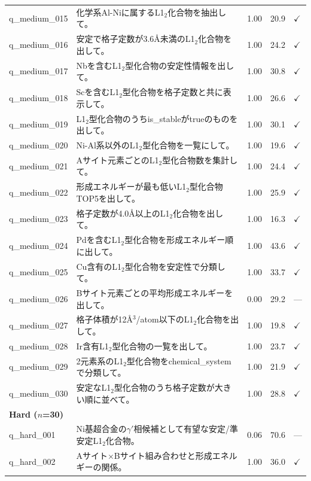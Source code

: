 \documentclass{npj-compt.mater}
\begin{document}
\begin{longtable}{lp{8.5cm}ccl}
    q\_medium\_015 & 化学系Al-Niに属するL1$_2$化合物を抽出して。 & 1.00 & 20.9 & $\checkmark$ \\
    q\_medium\_016 & 安定で格子定数が3.6\AA 未満のL1$_2$化合物を出して。 & 1.00 & 24.2 & $\checkmark$ \\
    q\_medium\_017 & Nbを含むL1$_2$型化合物の安定性情報を出して。 & 1.00 & 30.8 & $\checkmark$ \\
    q\_medium\_018 & Scを含むL1$_2$型化合物を格子定数と共に表示して。 & 1.00 & 26.6 & $\checkmark$ \\
    q\_medium\_019 & L1$_2$型化合物のうちis\_stableがtrueのものを出して。 & 1.00 & 30.1 & $\checkmark$ \\
    q\_medium\_020 & Ni-Al系以外のL1$_2$型化合物を一覧にして。 & 1.00 & 19.6 & $\checkmark$ \\
    q\_medium\_021 & Aサイト元素ごとのL1$_2$型化合物数を集計して。 & 1.00 & 24.4 & $\checkmark$ \\
    q\_medium\_022 & 形成エネルギーが最も低いL1$_2$型化合物TOP5を出して。 & 1.00 & 25.9 & $\checkmark$ \\
    q\_medium\_023 & 格子定数が4.0\AA 以上のL1$_2$化合物を出して。 & 1.00 & 16.3 & $\checkmark$ \\
    q\_medium\_024 & Pdを含むL1$_2$型化合物を形成エネルギー順に出して。 & 1.00 & 43.6 & $\checkmark$ \\
    q\_medium\_025 & Cu含有のL1$_2$型化合物を安定性で分類して。 & 1.00 & 33.7 & $\checkmark$ \\
    q\_medium\_026 & Bサイト元素ごとの平均形成エネルギーを出して。 & 0.00 & 29.2 & --- \\
    q\_medium\_027 & 格子体積が12\AA$^3$/atom以下のL1$_2$化合物を出して。 & 1.00 & 19.8 & $\checkmark$ \\
    q\_medium\_028 & Ir含有L1$_2$型化合物の一覧を出して。 & 1.00 & 23.7 & $\checkmark$ \\
    q\_medium\_029 & 2元素系のL1$_2$型化合物をchemical\_systemで分類して。 & 1.00 & 21.9 & $\checkmark$ \\
    q\_medium\_030 & 安定なL1$_2$型化合物のうち格子定数が大きい順に並べて。 & 1.00 & 28.8 & $\checkmark$ \\
    \midrule
    \multicolumn{5}{l}{\textbf{Hard ($n$=30)}} \\
    \midrule
    q\_hard\_001 & Ni基超合金の$\gamma'$相候補として有望な安定/準安定L1$_2$化合物。 & 0.06 & 70.6 & --- \\
    q\_hard\_002 & Aサイト$\times$Bサイト組み合わせと形成エネルギーの関係。 & 1.00 & 36.0 & $\checkmark$ \\

\end{longtable}
\end{document}
